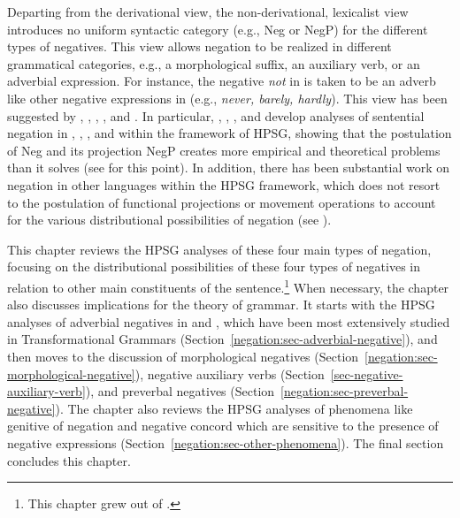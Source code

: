 \documentclass[output=paper
 	        ,biblatex
                ,babelshorthands
                ,newtxmath
                ,draftmode
                ,colorlinks, citecolor=brown
]{langscibook}
\begin{document}
Departing from the derivational view, the non-derivational, lexicalist view
introduces no uniform syntactic category (e.g., Neg or NegP) for the different types of
negatives. This view allows negation to be realized in different grammatical categories, e.g., a
morphological suffix, an auxiliary verb, or an adverbial expression. For instance, the negative
\emph{not} in  is taken to be an adverb like other negative expressions in
 (e.g., \textit{never, barely, hardly}). This view has been suggested by
\citet[343--347]{Jackendoff:72}, \citet[]{Baker:91}, \citet{Ernst:92}, \citet[]{Kim:00},
and \citet[]{Warner2000a-u}. 
In particular, \citet{KS:96}, \citet{AG:97}, \citet{Kim:00}, and \citet{KS:02} develop analyses of sentential negation in , , , and  within the framework of HPSG, showing that the postulation of Neg and its projection NegP creates more empirical and theoretical problems than it solves (see \citealt{Newmeyer:2006} for this point).
In addition, there has been substantial work on negation in other languages within the HPSG framework, which
does not resort to the postulation of functional projections or movement operations to account for the various distributional possibilities
of negation (see \citealt{PK:99, BJ:00, Prz:00, Kupsc:02, Swart:02, Borsley:05, Crysmann:10, Bender:13}).

This chapter reviews the HPSG analyses of these four main types of negation,
focusing on the distributional possibilities of these four types of negatives in
relation to other main constituents of the sentence.\footnote{This chapter grew out of \citet{Kim:00,kim:18}.} When
necessary, the chapter also discusses implications for
the theory of grammar.
It starts with the HPSG analyses of adverbial negatives in  and , which
have been most extensively studied in Transformational Grammars (Section~\ref{negation:sec-adverbial-negative}),
and then moves to the discussion of morphological
negatives (Section~\ref{negation:sec-morphological-negative}), negative auxiliary verbs
(Section~\ref{sec-negative-auxiliary-verb}), and preverbal negatives (Section~\ref{negation:sec-preverbal-negative}). The chapter
also reviews the HPSG analyses of phenomena like genitive of negation and
negative concord which are sensitive to the presence of negative expressions (Section~\ref{negation:sec-other-phenomena}). The
final section concludes this chapter.
\end{document}
